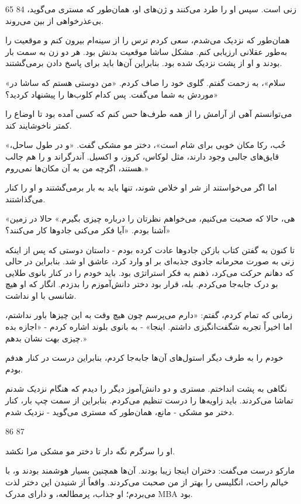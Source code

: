 65
84
زنی است. سپس او را طرد می‌کنند و ژن‌های او، همان‌طور که مستری می‌گوید، بی‌عذرخواهی از بین می‌روند.

همان‌طور که نزدیک می‌شدم، سعی کردم ترس را از سینه‌ام بیرون کنم و موقعیت را به‌طور عقلانی ارزیابی کنم. مشکل ساشا موقعیت بدنش بود. هر دو زن به سمت بار بودند و او از پشت نزدیک شده بود. بنابراین آن‌ها باید برای پاسخ دادن برمی‌گشتند.

«سلام»، به زحمت گفتم. گلوی خود را صاف کردم. «من دوستی هستم که ساشا در موردش به شما می‌گفت. پس کدام کلوب‌ها را پیشنهاد کردید؟»

می‌توانستم آهی از آرامش را از همه طرف‌ها حس کنم که کسی آمده بود تا اوضاع را کمتر ناخوشایند کند.

«خُب، رکا مکان خوبی برای شام است»، دختر مو مشکی گفت. «و در طول ساحل، قایق‌های جالبی وجود دارند، مثل لوکاس، کروز، و اکسیل. آندرگراند و را هم جالب هستند، اگرچه من به آن مکان‌ها نمی‌روم.»

اما اگر می‌خواستند از شر او خلاص شوند، تنها باید به بار برمی‌گشتند و او را کنار می‌گذاشتند.

«هی، حالا که صحبت می‌کنیم، می‌خواهم نظرتان را درباره چیزی بگیرم.» حالا در زمین آشنا بودم. «آیا فکر می‌کنی جادوها کار می‌کنند؟»

تا کنون به گفتن کتاب بازکن جادوها عادت کرده بودم - داستان دوستی که پس از اینکه زنی به صورت محرمانه جادوی جذبه‌ای بر او وارد کرد، عاشق او شد. بنابراین در حالی که دهانم حرکت می‌کرد، ذهنم به فکر استراتژی بود. باید خودم را در کنار بانوی طلایی بو درک جابه‌جا می‌کردم. بله، قرار بود دختر دانش‌آموزم را بدزدم. انگار که او هیچ شانسی با او نداشت.

زمانی که تمام کردم، گفتم: «دارم می‌پرسم چون هیچ وقت به این چیزها باور نداشتم، اما اخیراً تجربه شگفت‌انگیزی داشتم. اینجا» - به بانوی بلوند اشاره کردم - «اجازه بده چیزی بهت نشان بدهم.»

خودم را به طرف دیگر استول‌های آن‌ها جابه‌جا کردم، بنابراین درست در کنار هدفم بودم.

نگاهی به پشت انداختم. مستری و دو دانش‌آموز دیگر را دیدم که هنگام نزدیک شدنم تماشا می‌کردند. باید زاویه‌ها را درست تنظیم می‌کردم. بنابراین از سمت چپ بار، کنار دختر مو مشکی - مانع، همان‌طور که مستری می‌گوید - نزدیک شدم.

86 87

او را سرگرم نگه دار تا دختر مو مشکی مرا نکشد.

مارکو درست می‌گفت: دختران اینجا زیبا بودند. آن‌ها همچنین بسیار هوشمند بودند و، با خیالم راحت، انگلیسی را بهتر از من صحبت می‌کردند. واقعاً از شنیدن این دختر لذت می‌بردم؛ او جذاب، پرمطالعه، و دارای مدرک MBA بود.

